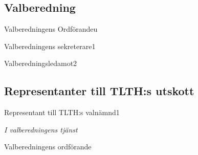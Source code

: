 \documentclass[10pt]{article}
\begin{document}
\subsection{Valberedning}
\begin{vallista}
    \begin{post}{Valberedningens Ordförande}{u}
    \end{post}
    \begin{post}{Valberedningens sekreterare}{1}
    \end{post}
    \begin{post}{Valberedningsledamot}{2}
    \end{post}
\end{vallista}

\subsection{Representanter till TLTH:s utskott}
\begin{vallista}
    \begin{post}{Representant till TLTH:s valnämnd}{1}
        \vakant
    \end{post}
\end{vallista}

\begin{signatures}{1}
\emph{I valberedningens tjänst}
\signature{Christian Benson}{Valberedningens ordförande}
\end{signatures}
\end{document}
